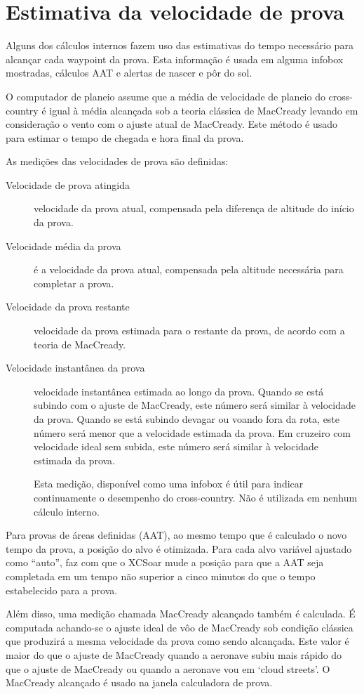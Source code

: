\section{Estimativa da velocidade de prova}\label{sec:task-speed-estim}

Alguns dos cálculos internos fazem uso das estimativas do tempo necessário para alcançar cada waypoint da prova.  Esta informação é usada em alguma infobox mostradas, cálculos AAT e alertas de nascer e pôr do sol.

O computador de planeio assume que a média de velocidade de planeio do cross-country é igual à média alcançada sob a teoria clássica de MacCready levando em consideração o vento com o ajuste atual de MacCready.  Este método é usado para estimar o tempo de chegada e hora final da prova.  


As medições das velocidades de prova são definidas:
\begin{description}
\item[Velocidade de prova atingida]  velocidade da prova atual, compensada pela diferença de altitude do início da prova.
\item[Velocidade média da prova]  é a velocidade da prova atual, compensada pela altitude necessária para completar a prova.
\item[Velocidade da prova restante] velocidade da prova estimada para o restante da prova, de acordo com a teoria de MacCready.
\item[Velocidade instantânea da prova]  velocidade instantânea estimada ao longo da prova.  Quando se está subindo com o ajuste de MacCready, este número será similar à velocidade da prova.  Quando se está subindo devagar ou voando fora da rota, este número será menor que a velocidade estimada da prova.  Em cruzeiro com velocidade ideal sem subida, este número será similar à velocidade estimada da prova.

Esta medição, disponível como uma infobox é útil para indicar continuamente o desempenho do cross-country.  Não é utilizada em nenhum cálculo interno.
\end{description}

Para provas de áreas definidas (AAT), ao mesmo tempo que é \tip calculado o novo tempo da prova, a posição do alvo é otimizada.  Para cada alvo variável ajustado como “auto”, faz com que o XCSoar mude a posição para que a AAT seja completada em um tempo não superior a cinco minutos do que o tempo estabelecido para a prova.

Além disso, uma medição chamada MacCready alcançado também é calculada.  É computada achando-se o ajuste ideal de vôo de MacCready sob condição clássica que produzirá a mesma velocidade da prova como sendo alcançada.  Este valor é maior do que o ajuste de MacCready quando a aeronave subiu mais rápido do que o ajuste de MacCready ou quando a aeronave vou em ‘cloud streets’.  O MacCready alcançado é usado na janela calculadora de prova.


